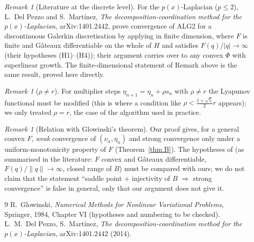 \documentclass[11pt]{amsart}
\theoremstyle{remark}
\newtheorem{remark}[teo]{Remark}
\theoremstyle{definition}
\begin{document}
\begin{remark}[Literature at the discrete level]
For the $p(x)$-Laplacian ($p\le2$), L.~Del Pezzo and S.~Mart\'inez, \emph{The decomposition-coordination method for the $p(x)$-Laplacian}, arXiv:1401.2442, prove convergence of ALG2 for a discontinuous Galerkin discretisation by applying \cite[Ch.~VI, Thm.~4.1 and 5.1]{Glowinski} in finite dimension, where $F$ is finite and G\^ateaux differentiable on the whole of $H$ and satisfies $F(q)/|q|\to\infty$ (their hypotheses (H1)--(H4)); their argument carries over to any convex $\Phi$ with superlinear growth. The finite-dimensional statement of Remark above is the same result, proved here directly.
\end{remark}
\begin{remark}[$\rho\ne r$]
For multiplier steps $\eta_{n+1}=\eta_n+\rho s_n$ with $\rho\ne r$ the Lyapunov functional must be modified (this is where a condition like $\rho<\frac{1+\sqrt5}2r$ appears); we only treated $\rho=r$, the case of the algorithm used in practice.
\end{remark}
\begin{remark}[Relation with Glowinski's theorem]
Our proof gives, for a general convex $F$, \emph{weak} convergence of $(\nu_n,\eta_n)$ and strong convergence only under a uniform-monotonicity property of $F$ (Theorem~\ref{thm.B}). The hypotheses of \cite[Ch.~VI, Thm.~5.1]{Glowinski} (as summarised in the literature: $F$ convex and G\^ateaux differentiable, $F(q)/\|q\|\to\infty$, closed range of $B$) must be compared with ours; we do not claim that the statement ``saddle point + injectivity of $B$ $\Rightarrow$ strong convergence'' is false in general, only that our argument does not give it.
\end{remark}

\begin{thebibliography}{9}
 R.~Glowinski, \emph{Numerical Methods for Nonlinear Variational Problems}, Springer, 1984, Chapter VI (hypotheses and numbering to be checked).
 L.~M.~Del Pezzo, S.~Mart\'inez, \emph{The decomposition-coordination method for the $p(x)$-Laplacian}, arXiv:1401.2442 (2014).
\end{thebibliography}
\end{document}
